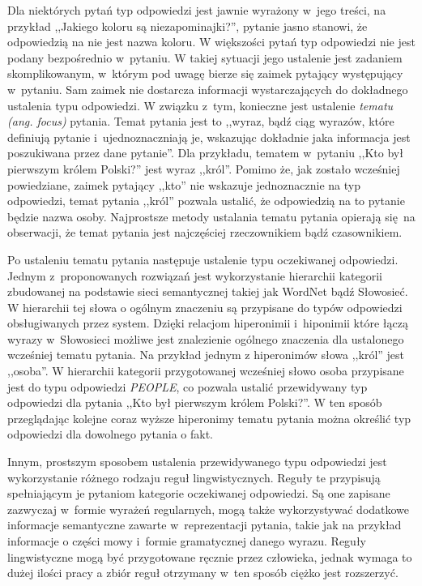 \documentclass[a4paper, twoside, openright, 12pt]{report}
\begin{document}
            Dla niektórych pytań typ odpowiedzi jest jawnie wyrażony w~jego treści, na przykład ,,Jakiego koloru są
            niezapominajki?'', pytanie jasno stanowi, że odpowiedzią na nie jest nazwa koloru. W większości pytań
            typ odpowiedzi nie jest podany bezpośrednio w~pytaniu. W takiej sytuacji jego ustalenie jest zadaniem
            skomplikowanym, w~którym pod uwagę bierze się zaimek pytający występujący w~pytaniu. Sam zaimek nie dostarcza
            informacji wystarczających do dokładnego ustalenia typu odpowiedzi. W związku z~tym, konieczne jest ustalenie
            \emph{tematu (ang. focus)} pytania. Temat pytania jest to ,,wyraz, bądź ciąg wyrazów, które definiują pytanie
            i~ujednoznaczniają je, wskazując dokładnie jaka informacja jest poszukiwana przez dane pytanie''\cite{QUESTIONFOCUS}.
            Dla przykładu, tematem w~pytaniu ,,Kto był pierwszym królem Polski?'' jest wyraz ,,król''. Pomimo że,
            jak zostało wcześniej powiedziane, zaimek pytający ,,kto'' nie wskazuje jednoznacznie na typ odpowiedzi,
            temat pytania ,,król'' pozwala ustalić, że odpowiedzią na to pytanie będzie nazwa osoby.  Najprostsze metody
            ustalania tematu pytania opierają się na obserwacji, że temat pytania jest najczęściej rzeczownikiem bądź
            czasownikiem.

            Po ustaleniu tematu pytania następuje ustalenie typu oczekiwanej odpowiedzi. Jednym z~proponowanych
            rozwiązań jest wykorzystanie hierarchii kategorii zbudowanej na podstawie sieci semantycznej takiej jak
            WordNet bądź Słowosieć\cite{PASZKA}. W hierarchii tej słowa o ogólnym znaczeniu są przypisane do typów
            odpowiedzi obsługiwanych przez system. Dzięki relacjom hiperonimii i~hiponimii które łączą wyrazy w~Słowosieci
            możliwe jest znalezienie ogólnego znaczenia dla ustalonego wcześniej tematu pytania. Na przykład jednym z
            hiperonimów słowa ,,król'' jest ,,osoba''. W hierarchii kategorii przygotowanej wcześniej słowo osoba przypisane
            jest do typu odpowiedzi \emph{PEOPLE}, co pozwala ustalić przewidywany typ odpowiedzi dla pytania
            ,,Kto był pierwszym królem Polski?''. W ten sposób przeglądając kolejne coraz wyższe hiperonimy tematu
            pytania można określić typ odpowiedzi dla dowolnego pytania o fakt.

            Innym, prostszym sposobem ustalenia przewidywanego typu odpowiedzi jest wykorzystanie różnego rodzaju reguł
            lingwistycznych. Reguły te przypisują spełniającym je pytaniom kategorie oczekiwanej odpowiedzi. Są one zapisane
            zazwyczaj w~formie wyrażeń regularnych, mogą także wykorzystywać dodatkowe informacje semantyczne zawarte
            w~reprezentacji pytania, takie jak na przykład informacje o części mowy i~formie gramatycznej danego wyrazu.
            Reguły lingwistyczne mogą być przygotowane ręcznie przez człowieka, jednak wymaga to dużej ilości pracy a
            zbiór reguł otrzymany w~ten sposób ciężko jest rozszerzyć.
\end{document}
